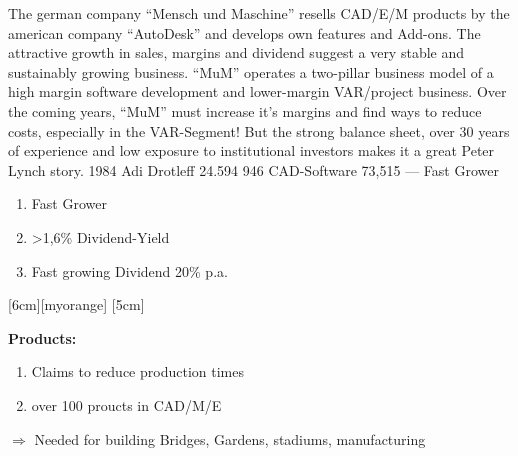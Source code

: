 \documentclass{company_analysis}
\begin{document}


\story
    {The german company \enquote{Mensch und Maschine} resells CAD/E/M
    products by the american company \enquote{AutoDesk} and develops
    own features and Add-ons. The attractive growth in sales, margins
    and dividend suggest a very stable and sustainably growing business.
    \enquote{MuM} operates a two-pillar business model of a high margin
    software development and lower-margin VAR/project business.
    Over the coming years, \enquote{MuM} must increase it's margins
    and find ways to reduce costs, especially in the VAR-Segment!
    But the strong balance sheet, over 30 years of experience and low
    exposure to institutional investors makes it a great Peter Lynch story.}\hfill
\infosection
    {1984}
    {Adi Drotleff}
    {24.594}
    {946}
    {CAD-Software}
    {73,515}
    {---}
    {Fast Grower}
    {\begin{enumerate}[leftmargin=0.8em, labelsep=0.2em]
        \item Fast Grower
        \item \textgreater 1,6\% Dividend-Yield
        \item Fast growing Dividend 20\% p.a.
    \end{enumerate}
    }
[6cm][myorange]
[5cm]
\hfill{}




\begin{minipage}{.6\linewidth}
    \faArchive\space\textbf{Products:}
    \begin{enumerate}
        \item Claims to reduce production times
        \item over 100 proucts in CAD/M/E
    \end{enumerate}
    $\Rightarrow$ Needed for building Bridges, Gardens, stadiums, manufacturing

\end{minipage}
\end{document}
